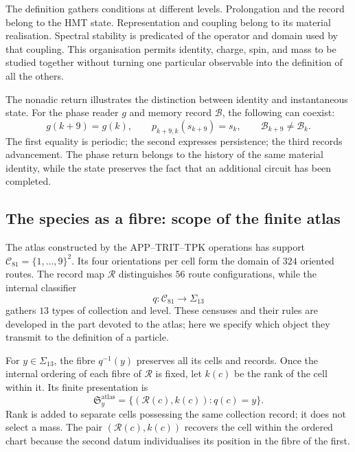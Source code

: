 The definition gathers conditions at different levels. Prolongation
and the record belong to the HMT state. Representation and
coupling belong to its material realisation. Spectral
stability is predicated of the operator and domain used by that
coupling. This organisation permits identity,
charge, spin, and mass to be studied together without turning one particular observable into the definition
of all the others.

The nonadic return illustrates the distinction between identity and instantaneous
state. For the phase reader $g$ and memory record
$\mathcal B$, the following can coexist:
\begin{equation}
 g(k+9)=g(k),\qquad
 p_{k+9,k}(s_{k+9})=s_k,\qquad
 \mathcal B_{k+9}\ne\mathcal B_k.
 \label{vi:eq:persistencia-fase-memoria}
\end{equation}
The first equality is periodic; the second expresses persistence; the
third records advancement. The phase return belongs to the history
of the same material identity, while the state preserves the fact that
an additional circuit has been completed.

\subsection{The species as a fibre: scope of the finite atlas}
\label{vi:subsec:especie-fibra}

The atlas constructed by the APP--TRIT--TPK operations has support
$\mathcal C_{81}=\{1,\ldots,9\}^2$. Its four orientations per
cell form the domain of $324$ oriented routes. The record map
$\mathcal R$ distinguishes $56$ route configurations, while the
internal classifier
\begin{equation}
 q:\mathcal C_{81}\longrightarrow\Sigma_{13}
 \label{vi:eq:clasificador-especies}
\end{equation}
gathers $13$ types of collection and level. These censuses and their rules are
developed in the part devoted to the atlas; here we specify which object
they transmit to the definition of a particle.

For $y\in\Sigma_{13}$, the fibre $q^{-1}(y)$ preserves all its
cells and records. Once the internal ordering of each fibre of
$\mathcal R$ is fixed, let $k(c)$ be the rank of the cell within it. Its
finite presentation is
\begin{equation}
 \mathfrak S_y^{\mathrm{atlas}}
 =\{(\mathcal R(c),k(c)):q(c)=y\}.
 \label{vi:eq:multiseccion-atlas}
\end{equation}
Rank is added to separate cells possessing the same collection
record; it does not select a mass. The pair $(\mathcal R(c),k(c))$
recovers the cell within the ordered chart because the second datum
individualises its position in the fibre of the first.

